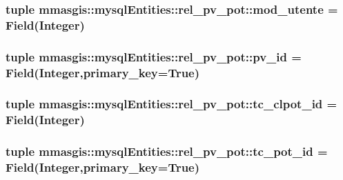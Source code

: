 \hypertarget{classmmasgis_1_1mysqlEntities_1_1rel__pv__pot_ab178eb1e9cc50226848430eb34f8f57c}{
\subsubsection[{mod\_\-utente}]{\setlength{\rightskip}{0pt plus 5cm}tuple {\bf mmasgis::mysqlEntities::rel\_\-pv\_\-pot::mod\_\-utente} = Field(Integer)}}
\label{classmmasgis_1_1mysqlEntities_1_1rel__pv__pot_ab178eb1e9cc50226848430eb34f8f57c}
\hypertarget{classmmasgis_1_1mysqlEntities_1_1rel__pv__pot_aab1b8a86ade1413faa73a2010e00dfbd}{
\subsubsection[{pv\_\-id}]{\setlength{\rightskip}{0pt plus 5cm}tuple {\bf mmasgis::mysqlEntities::rel\_\-pv\_\-pot::pv\_\-id} = Field(Integer,primary\_\-key=True)}}
\label{classmmasgis_1_1mysqlEntities_1_1rel__pv__pot_aab1b8a86ade1413faa73a2010e00dfbd}
\hypertarget{classmmasgis_1_1mysqlEntities_1_1rel__pv__pot_a7601091eb7ad449b14db2be4be7d1024}{
\subsubsection[{tc\_\-clpot\_\-id}]{\setlength{\rightskip}{0pt plus 5cm}tuple {\bf mmasgis::mysqlEntities::rel\_\-pv\_\-pot::tc\_\-clpot\_\-id} = Field(Integer)}}
\label{classmmasgis_1_1mysqlEntities_1_1rel__pv__pot_a7601091eb7ad449b14db2be4be7d1024}
\hypertarget{classmmasgis_1_1mysqlEntities_1_1rel__pv__pot_a03b289fa596d71251aa6a80bc2d67690}{
\subsubsection[{tc\_\-pot\_\-id}]{\setlength{\rightskip}{0pt plus 5cm}tuple {\bf mmasgis::mysqlEntities::rel\_\-pv\_\-pot::tc\_\-pot\_\-id} = Field(Integer,primary\_\-key=True)}}

